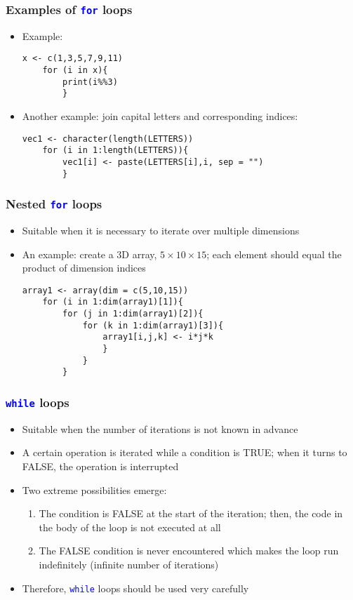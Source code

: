 \documentclass[10pt]{beamer}
\newcommand{\cc}[1]{\texttt{\textcolor{blue}{#1}}}
\theoremstyle{definition}
\begin{document}
\begin{frame}[fragile]
\frametitle{Examples of \cc{for} loops}
\begin{itemize}
	\item Example:
	\begin{lstlisting}[style = rstyle, breaklines]
	x <- c(1,3,5,7,9,11)
	for (i in x){
		print(i%%3)
		}
	\end{lstlisting}
	\item Another example: join capital letters and corresponding indices:
	\begin{lstlisting}[style = rstyle, breaklines]
	vec1 <- character(length(LETTERS))
	for (i in 1:length(LETTERS)){
		vec1[i] <- paste(LETTERS[i],i, sep = "")
		}
	\end{lstlisting}
\end{itemize}
\end{frame}

\begin{frame}[fragile]
\frametitle{Nested \cc{for} loops}
\begin{itemize}
	\item Suitable when it is necessary to iterate over multiple dimensions
	\item An example: create a 3D array, $5\times 10 \times 15$; each element should equal the product of dimension indices
	\begin{lstlisting}[style = rstyle, breaklines]
	array1 <- array(dim = c(5,10,15))
	for (i in 1:dim(array1)[1]){
		for (j in 1:dim(array1)[2]){
			for (k in 1:dim(array1)[3]){
				array1[i,j,k] <- i*j*k
				}
			}
		}
	\end{lstlisting}
\end{itemize}
\end{frame}

\begin{frame}[fragile]
\frametitle{\cc{while} loops}
\begin{itemize}
	\item Suitable when the number of iterations is not known in advance
	\item A certain operation is iterated while a condition is TRUE; when it turns to FALSE, the operation is interrupted
	\item Two extreme possibilities emerge:
	\begin{enumerate}
		\item The condition is FALSE at the start of the iteration; then, the code in the body of the loop is not executed at all
		\item The FALSE condition is never encountered which makes the loop run indefinitely (infinite number of iterations)
	\end{enumerate}
	\item Therefore, \cc{while} loops should be used very carefully
\end{itemize}
\end{frame}
\end{document}
